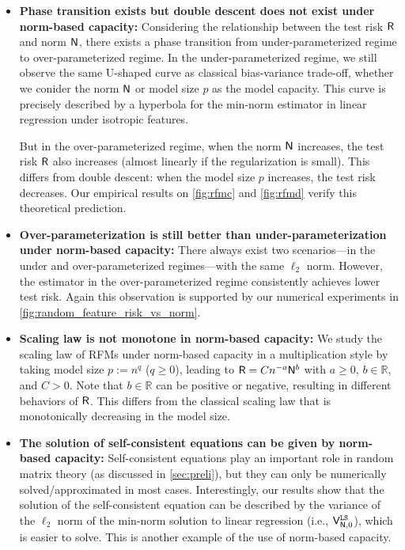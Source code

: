\begin{itemize}
    \item {\bf Phase transition exists but double descent does not exist under norm-based capacity:} Considering the relationship between the test risk $\mathsf R$ and norm $\mathsf N$, there exists a phase transition from under-parameterized regime to over-parameterized regime. In the under-parameterized regime, we still observe the same U-shaped curve as classical bias-variance trade-off, whether we conider the norm $\mathsf N$ or model size $p$ as the model capacity. This curve is precisely described by a hyperbola for the  min-norm estimator in  linear regression under isotropic features.
    
    But in the over-parameterized regime, when the norm $\mathsf N$ increases, the test risk $\mathsf R$ also increases (almost linearly if the regularization is small). This differs from double descent: when the model size $p$ increases, the test risk decreases. Our empirical results on \cref{fig:rfmc} and \ref{fig:rfmd} verify this theoretical prediction.
    \vspace{-0.1cm}
    
    \item {\bf Over-parameterization is still better than under-parameterization under norm-based capacity:} There always exist two scenarios---in the under and over-parameterized regimes---with the same $\ell_2$ norm. However, the estimator in the over-parameterized regime consistently achieves lower test risk. Again this observation is supported by our numerical experiments in \cref{fig:random_feature_risk_vs_norm}.
    \vspace{-0.1cm}
    
    \item {\bf Scaling law is not monotone in norm-based capacity:} We study the scaling law of RFMs under norm-based capacity in a multiplication style by taking model size $p:=n^q$ ($q\geq 0$), leading to $\mathsf R = C n^{-a} \mathsf N^{b}$ with $a \geq 0$, $b \in \mathbb{R}$, and $C>0$. Note that $b \in \mathbb{R}$ can be positive or negative, resulting in different behaviors of $\mathsf R$. This differs from the classical scaling law that is monotonically decreasing in the model size.
    \vspace{-0.1cm}
    
    \item {\bf The solution of self-consistent equations can be given by norm-based capacity:} Self-consistent equations play an important role in random matrix theory (as discussed in \cref{sec:preli}), but they can only be numerically solved/approximated in most cases. Interestingly, our results show that the solution of the self-consistent equation can be described by the variance of the $\ell_2$ norm of the min-norm solution to linear regression (i.e., $\mathsf V_{\mathsf N,0}^{\tt LS}$), which is easier to solve. This is another example of the use of norm-based capacity.
\end{itemize}

